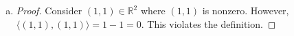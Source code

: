 \begin{Exercise}
	\begin{enumerate}[(a)]
		\item
		\begin{proof}
			Consider $(1,1)\in\mathbb{R}^2$ where $(1,1)$ is nonzero. However, $\langle (1,1),(1,1) \rangle = 1-1 = 0$. This violates the definition. 
		\end{proof}
	\end{enumerate}
\end{Exercise}